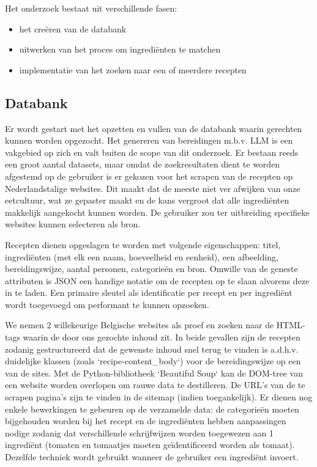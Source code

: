 \documentclass{hogent-article}
\begin{document}
Het onderzoek bestaat uit verschillende fasen:
\begin{itemize}
    \item het creëren van de databank
    \item uitwerken van het proces om ingrediënten te matchen
    \item implementatie van het zoeken naar een of meerdere recepten
\end{itemize}

\subsection{Databank}%

Er wordt gestart met het opzetten en vullen van de databank waarin gerechten kunnen worden opgezocht. Het genereren van bereidingen m.b.v. LLM is een vakgebied op zich en valt buiten de scope van dit onderzoek. Er bestaan reeds een groot aantal datasets, maar omdat de zoekresultaten dient te worden afgestemd op de gebruiker is er gekozen voor het scrapen van de recepten op Nederlandstalige websites. Dit maakt dat de meeste niet ver afwijken van onze eetcultuur, wat ze gepaster maakt en de kans vergroot dat alle ingrediënten makkelijk aangekocht kunnen worden. De gebruiker zou ter uitbreiding specifieke websites kunnen selecteren als bron.

Recepten dienen opgeslagen te worden met volgende eigenschappen: titel, ingrediënten (met elk een naam, hoeveelheid en eenheid), een afbeelding, bereidingswijze, aantal personen, categorieën en bron. Omwille van de geneste attributen is JSON een handige notatie om de recepten op te slaan alvorens deze in te laden. Een primaire sleutel als identificatie per recept en per ingrediënt wordt toegevoegd om performant te kunnen opzoeken.

We nemen 2 willekeurige Belgische websites als proef en zoeken naar de HTML-tags waarin de door ons gezochte inhoud zit. In beide gevallen zijn de recepten zodanig gestructureerd dat de gewenste inhoud snel terug te vinden is a.d.h.v. duidelijke klassen (zoals `recipe-content\_body`) voor de bereidingswijze op een van de sites. Met de Python-bibliotheek `Beautiful Soup` kan de DOM-tree van een website worden overlopen om rauwe data te destilleren. De URL's van de te scrapen pagina's zijn te vinden in de sitemap (indien toegankelijk).  Er dienen nog enkele bewerkingen te gebeuren op de verzamelde data: de categorieën moeten bijgehouden worden bij het recept en de ingrediënten hebben aanpassingen nodige zodanig dat verschillende schrijfwijzen worden toegewezen aan 1 ingrediënt (tomaten en tomaatjes moeten geïdentificeerd worden als tomaat). Dezelfde techniek wordt gebruikt wanneer de gebruiker een ingrediënt invoert.
\end{document}
